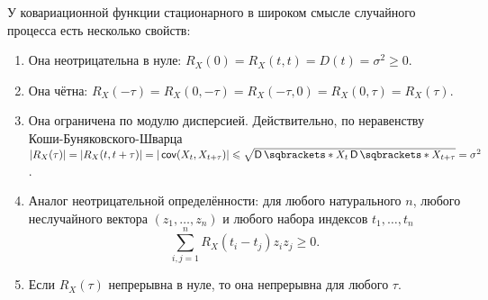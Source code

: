 У ковариационной функции стационарного в широком смысле случайного процесса 
есть несколько свойств:
\begin{enumerate}
	\item Она неотрицательна в нуле: \(R_{X}(0) = R_{X}(t, t) = D(t) = 
	\sigma^{2} \geq 0\).
	\item Она чётна: \(R_{X}(-\tau) = R_{X}(0, -\tau) = R_{X}(-\tau, 0) = 
	R_{X}(0, \tau) = R_{X}(\tau)\).
	\item Она ограничена по модулю дисперсией. Действительно, по неравенству 
	Коши-Буня\-ковского-Шварца \(|R_{X}(\tau)| = |R_{X}(t, t + 
	\tau)| = |\cov(X_{t}, X_{t + \tau})| \leq \sqrt{\D{X_{t}}\D{X_{t + \tau}}} 
	= \sigma^{2}\).
	\item Аналог неотрицательной определённости: для любого натурального \(n\), 
	любого неслучайного вектора \((z_{1}, \ldots, z_{n})\) и любого набора 
	индексов \(t_{1}, \ldots, t_{n}\)
	\[
		\sum_{i, j = 1}^{n} R_{X}(t_{i} - t_{j})z_{i}z_{j} \geq 0.
	\]
	\item Если \(R_{X}(\tau)\) непрерывна в нуле, то она непрерывна для любого 
	\(\tau\).
\end{enumerate}
